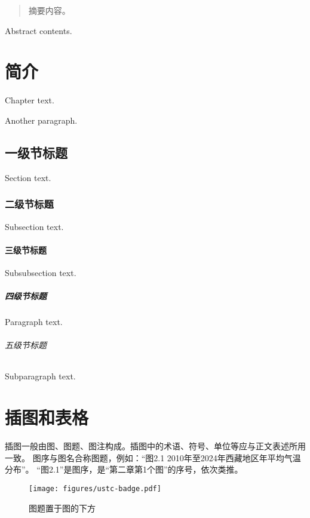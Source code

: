 \frontmatter
{}

\begin{abstract}
  摘要内容。
\end{abstract}

\begin{abstract*}
  Abstract contents.
\end{abstract*}

\tableofcontents

\mainmatter
\chapter{简介}
Chapter text. \par
Another paragraph.
\section{一级节标题}
Section text.
\subsection{二级节标题}
Subsection text.
\subsubsection{三级节标题}
Subsubsection text.
\paragraph{四级节标题}
Paragraph text.
\subparagraph{五级节标题}
Subparagraph text.

\chapter{插图和表格}

插图一般由图、图题、图注构成。插图中的术语、符号、单位等应与正文表述所用一致。
图序与图名合称图题，例如：“图2.1  2010年至2024年西藏地区年平均气温分布”。
“图2.1”是图序，是“第二章第1个图”的序号，依次类推。

\begin{figure}[h]
  \centering
  \texttt{[image: figures/ustc-badge.pdf]}
  \caption{图题置于图的下方}
  \label{fig:badge}
\end{figure}

